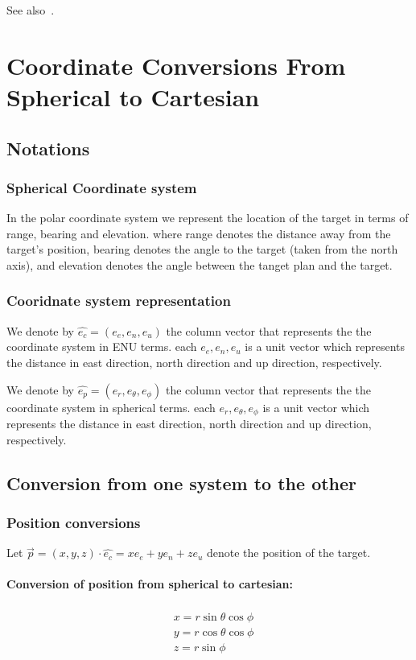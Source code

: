 \documentclass{article}
\newcommand{\east}{e_e}
\newcommand{\north}{e_n}
\newcommand{\up}{e_u}
\newcommand{\range}{e_r}
\newcommand{\bearing}{e_\theta}
\newcommand{\elevation}{e_\phi}
\newcommand{\carvec}{\hat{e_{c}}}
\newcommand{\polvec}{\hat{e_{p}}}
\begin{document}
See also~\cite{osen2017accurate}.


\section{Coordinate Conversions From Spherical to Cartesian}

\subsection{Notations}
\subsubsection{Spherical Coordinate system}
In the polar coordinate system we represent the location of the target in terms
of range, bearing and elevation. where range denotes the distance away from the
target's position, bearing denotes the angle to the target (taken from the north
axis), and elevation denotes the angle between the tanget plan and the target.


\subsubsection{Cooridnate system representation}

We denote by $\carvec=(\east,\north, \up)$ the column vector that represents
the the coordinate system in ENU terms. each $\east,\north, \up$ is a unit vector
which represents the distance in east direction, north direction and up
direction, respectively.

We denote by $\polvec=(\range,\bearing,\elevation)$ the column vector that
represents the the coordinate system in spherical terms. each $\range,\bearing,\elevation$ is a
unit vector which represents the distance in east direction, north direction and up
direction, respectively.

\subsection{Conversion from one system to the other}

\subsubsection{Position conversions}
Let $\vec{p} = (x,y,z) \cdot \carvec = x\east + y\north + z\up$ denote the
position of the target.


\paragraph{Conversion of position from spherical to cartesian:}
\begin{align}\label{eq:cartesian-position}
\begin{split}
{}& x=r\sin \theta \cos \phi \\
{}& y=r\cos \theta \cos \phi \\
{}& z=r\sin \phi
\end{split}
\end{align}
\end{document}
